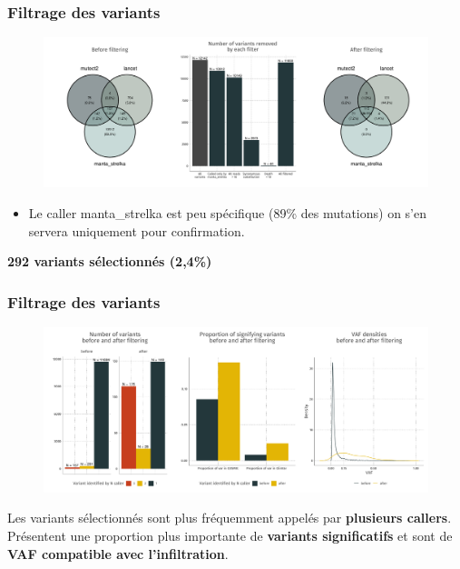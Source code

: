 \documentclass[aspectratio=1610]{beamer}
\begin{document}
\begin{frame}
  \frametitle{ Filtrage des variants}
  \begin{center}
    \begin{figure}
      \includegraphics[width=\textwidth]{Images/Filtering_A.pdf}
    \end{figure}
  \end{center}
  \begin{itemize}
    \item Le caller manta\_strelka est peu spécifique (89\% des mutations) on s'en servera uniquement pour confirmation.
  \end{itemize}
  \textbf{
     292 variants sélectionnés (2,4\%)
  }
\end{frame}

\begin{frame}
  \frametitle{ Filtrage des variants}
  \begin{center}
    \begin{figure}
      \includegraphics[width=\textwidth]{Images/Filtering_B.pdf}
    \end{figure}
  \end{center}
  Les variants sélectionnés sont plus fréquemment appelés par \textbf{plusieurs callers}. Présentent une proportion plus importante de \textbf{variants significatifs} et sont de \textbf{VAF compatible avec l'infiltration}.
\end{frame}
\end{document}
